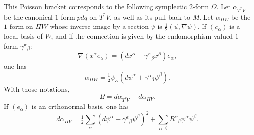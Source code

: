 This Poisson bracket corresponds to the following
symplectic $2$-form $\Omega$.
Let $\alpha_{T^*V}$ be the canonical $1$-form $pdq$ on
$T^*V$, as well as its pull back to $M$.
Let $\alpha_{\Pi W}$ be the $1$-form on $\Pi W$ whose
inverse image by a section $\psi$ is
$\frac12(\psi,\nabla\psi)$.
If $(e_\alpha)$ is a local basis of $W$, and if the
connection is given by the endomorphism valued $1$-form
$\gamma^\alpha{}_\beta$:
$$
\nabla(x^\alpha e_\alpha)=(dx^\alpha+\gamma^\alpha{}_\beta 
x^\beta) e_\alpha,
$$
one has
$$
\alpha_{\Pi W}=\tfrac12\psi_\alpha(d\psi^\alpha
  +\gamma^\alpha{}_\beta \psi^\beta).
$$
With those notations,
$$
\Omega=d\alpha_{T^*V}+d\alpha_{\Pi V}.
$$
If $(e_\alpha)$ is an orthonormal basis, one has
$$
d\alpha_{\Pi V}=\tfrac12 \sum\limits_{\alpha}(d\psi^\alpha
  +\gamma^\alpha{}_\beta
\psi^\beta)^2+\sum\limits_{\alpha,\beta}
R^\alpha{}_\beta \psi^\alpha \psi^\beta.
$$
















\enddocument



